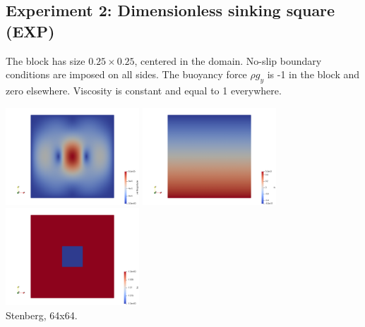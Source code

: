 \newpage
\subsection*{Experiment 2: Dimensionless sinking square (EXP)}

The block has size $0.25\times 0.25$, centered in the domain. No-slip boundary conditions are imposed on all 
sides. The buoyancy force $\rho g_y$ is -1 in the block and zero elsewhere. Viscosity is constant and 
equal to 1 everywhere. 

\begin{center}
\includegraphics[width=5cm]{python_codes/fieldstone_78/results/exp02/vel}
\includegraphics[width=5cm]{python_codes/fieldstone_78/results/exp02/p}
\includegraphics[width=5cm]{python_codes/fieldstone_78/results/exp02/by}\\
{\captionfont Stenberg, 64x64.}
\end{center}

